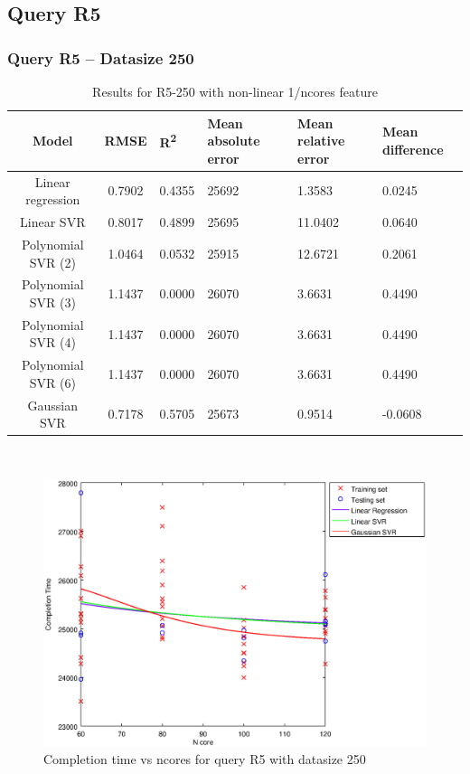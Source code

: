 \documentclass[a4paper,11pt]{article}
\begin{document}
\newpage
\subsection{Query R5}
\subsubsection{Query R5 -- Datasize 250}
\begin{table}[H]
	\centering
	\begin{adjustbox}{center}
		\begin{tabular}{c | c M{1.2cm} M{2.5cm} M{2.5cm} M{1.8cm}}
			Model & RMSE & R\textsuperscript{2} & Mean absolute error & Mean relative error & Mean difference \tabularnewline
			\hline
			Linear regression & 0.7902 & 0.4355 &  25692 & 1.3583 & 0.0245 \\
			Linear SVR & 0.8017 & 0.4899 &  25695 & 11.0402 & 0.0640 \\
			Polynomial SVR (2) & 1.0464 & 0.0532 &  25915 & 12.6721 & 0.2061 \\
			Polynomial SVR (3) & 1.1437 & 0.0000 &  26070 & 3.6631 & 0.4490 \\
			Polynomial SVR (4) & 1.1437 & 0.0000 &  26070 & 3.6631 & 0.4490 \\
			Polynomial SVR (6) & 1.1437 & 0.0000 &  26070 & 3.6631 & 0.4490 \\
			Gaussian SVR & 0.7178 & 0.5705 &  25673 & 0.9514 & -0.0608 \\
		\end{tabular}
	\end{adjustbox}
	\\
	\caption{Results for R5-250 with non-linear 1/ncores feature}
	\label{table_R5_prediction_all}
\end{table}

\begin {figure}[hbtp]
\centering
\includegraphics[width=\textwidth]{output/R5_250_NO_72_90_1_OVER_NCORES/plot_R5_250_bestmodels.eps}
\caption {Completion time vs ncores for query R5 with datasize 250}
\end {figure}
\end{document}
